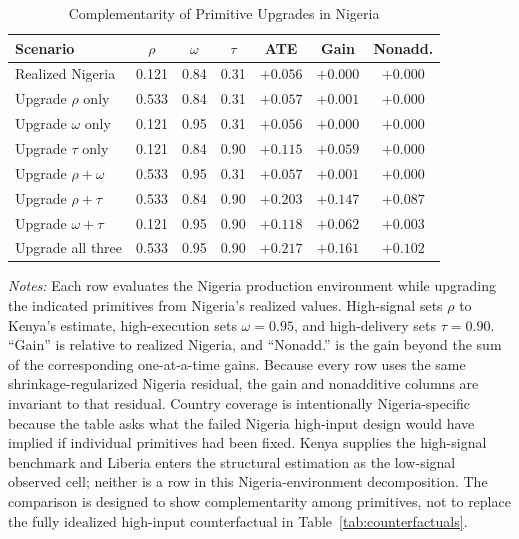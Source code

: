 \begin{table}[H]
\centering
\caption{Complementarity of Primitive Upgrades in Nigeria}
\label{tab:struct_complementarity}
\begin{threeparttable}
\footnotesize
\begin{tabular}[t]{lcccccc}
\toprule
Scenario & $\rho$ & $\omega$ & $\tau$ & ATE & Gain & Nonadd. \\
\midrule
Realized Nigeria & 0.121 & 0.84 & 0.31 & $+0.056$ & $+0.000$ & $+0.000$ \\
Upgrade $\rho$ only & 0.533 & 0.84 & 0.31 & $+0.057$ & $+0.001$ & $+0.000$ \\
Upgrade $\omega$ only & 0.121 & 0.95 & 0.31 & $+0.056$ & $+0.000$ & $+0.000$ \\
Upgrade $\tau$ only & 0.121 & 0.84 & 0.90 & $+0.115$ & $+0.059$ & $+0.000$ \\
Upgrade $\rho+\omega$ & 0.533 & 0.95 & 0.31 & $+0.057$ & $+0.001$ & $+0.000$ \\
Upgrade $\rho+\tau$ & 0.533 & 0.84 & 0.90 & $+0.203$ & $+0.147$ & $+0.087$ \\
Upgrade $\omega+\tau$ & 0.121 & 0.95 & 0.90 & $+0.118$ & $+0.062$ & $+0.003$ \\
Upgrade all three & 0.533 & 0.95 & 0.90 & $+0.217$ & $+0.161$ & $+0.102$ \\
\bottomrule
\end{tabular}
\begin{tablenotes}
\footnotesize
\item \textit{Notes:} Each row evaluates the Nigeria production environment while upgrading the indicated primitives from Nigeria's realized values. High-signal sets $\rho$ to Kenya's estimate, high-execution sets $\omega=0.95$, and high-delivery sets $\tau=0.90$. ``Gain'' is relative to realized Nigeria, and ``Nonadd.'' is the gain beyond the sum of the corresponding one-at-a-time gains. Because every row uses the same shrinkage-regularized Nigeria residual, the gain and nonadditive columns are invariant to that residual. Country coverage is intentionally Nigeria-specific because the table asks what the failed Nigeria high-input design would have implied if individual primitives had been fixed. Kenya supplies the high-signal benchmark and Liberia enters the structural estimation as the low-signal observed cell; neither is a row in this Nigeria-environment decomposition. The comparison is designed to show complementarity among primitives, not to replace the fully idealized high-input counterfactual in Table~\ref{tab:counterfactuals}.
\end{tablenotes}
\end{threeparttable}
\end{table}
